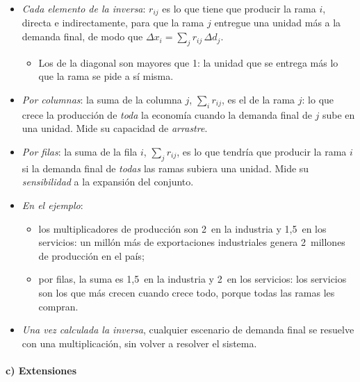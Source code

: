\documentclass[11pt]{article}
\begin{document}
\begin{itemize}
\item \emph{Cada elemento de la inversa}: $r_{ij}$ es lo que tiene que producir la rama $i$, directa e indirectamente, para que la rama $j$ entregue una unidad más a la demanda final, de modo que $\Delta x_i=\sum_j r_{ij}\,\Delta d_j$.
  \begin{itemize}
  \item Los de la diagonal son mayores que 1: la unidad que se entrega más lo que la rama se pide a sí misma.
  \end{itemize}
\item \emph{Por columnas}: la suma de la columna $j$, $\sum_i r_{ij}$, es el  de la rama $j$: lo que crece la producción de \emph{toda} la economía cuando la demanda final de $j$ sube en una unidad. Mide su capacidad de \emph{arrastre}.
\item \emph{Por filas}: la suma de la fila $i$, $\sum_j r_{ij}$, es lo que tendría que producir la rama $i$ si la demanda final de \emph{todas} las ramas subiera una unidad. Mide su \emph{sensibilidad} a la expansión del conjunto.
\item \emph{En el ejemplo}:
  \begin{itemize}
  \item los multiplicadores de producción son 2~en la industria y 1,5~en los servicios: un millón más de exportaciones industriales genera 2~millones de producción en el país;
  \item por filas, la suma es 1,5~en la industria y 2~en los servicios: los servicios son los que más crecen cuando crece todo, porque todas las ramas les compran.
  \end{itemize}
\item \emph{Una vez calculada la inversa}, cualquier escenario de demanda final se resuelve con una multiplicación, sin volver a resolver el sistema.
\end{itemize}

\paragraph{c) Extensiones}
\end{document}

